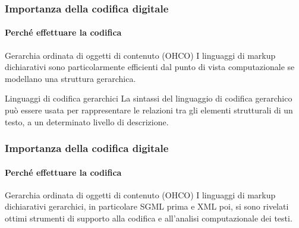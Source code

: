 \begin{frame}
	\frametitle{Importanza della codifica digitale}
	\framesubtitle{Perché effettuare la codifica}
	\addtocounter{nframe}{1}

	\begin{block}{Gerarchia ordinata di oggetti di contenuto (OHCO)}
		I linguaggi di markup dichiarativi sono particolarmente efficienti dal punto di vista computazionale se modellano una struttura gerarchica. 
	\end{block}

	\begin{block}{Linguaggi di codifica gerarchici}
		La sintassi del linguaggio di codifica gerarchico può essere usata per rappresentare le relazioni tra gli elementi strutturali di un testo, a un determinato livello di descrizione.
	\end{block}

\end{frame}

\begin{frame}
	\frametitle{Importanza della codifica digitale}
	\framesubtitle{Perché effettuare la codifica}
	\addtocounter{nframe}{1}

	\begin{block}{Gerarchia ordinata di oggetti di contenuto (OHCO)}
	 I linguaggi di markup dichiarativi gerarchici, in particolare SGML prima e XML poi, si sono rivelati ottimi strumenti di supporto alla codifica e all’analisi computazionale dei testi.
	\end{block}

\end{frame}




